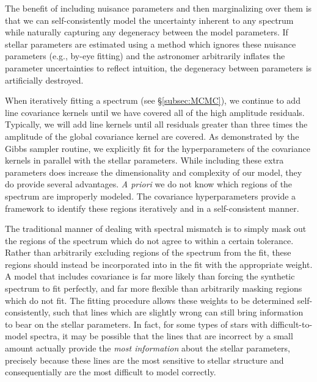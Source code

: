 \documentclass[iop,floatfix]{emulateapj}
\begin{document}
The benefit of including nuisance parameters and then marginalizing over them is that we can self-consistently model the uncertainty inherent to any spectrum while naturally capturing any degeneracy between the model parameters. If stellar parameters are estimated using a method which ignores these nuisance parameters (e.g., by-eye fitting) and the astronomer arbitrarily inflates the parameter uncertainties to reflect intuition, the degeneracy between parameters is artificially destroyed. 

When iteratively fitting a spectrum (see \S\ref{subsec:MCMC}), we continue to add line covariance kernels until we have covered all of the high amplitude residuals. Typically, we will add line kernels until all residuals greater than three times the amplitude of the global covariance kernel are covered.  As demonstrated by the Gibbs sampler routine, we explicitly fit for the
hyperparameters of the covariance kernels in parallel with the
stellar parameters. While including these extra parameters does increase the
dimensionality and complexity of our model, they do provide several advantages.
\emph{A priori} we do not know which regions of the spectrum are improperly
modeled. The covariance hyperparameters provide a framework to identify these
regions iteratively and in a self-consistent manner. 

The traditional manner of dealing with spectral mismatch is to simply mask out the regions of the spectrum which do not agree to within a certain tolerance.  Rather than arbitrarily excluding regions of the spectrum from the fit, these regions should instead be incorporated into in the fit with the appropriate weight. A model that includes covariance is far more likely than forcing the synthetic spectrum to fit perfectly, and far more flexible than arbitrarily masking regions which do not fit. The fitting procedure allows these weights to be determined self-consistently, such that lines which are slightly wrong can still bring information to bear on the stellar parameters. In fact, for some types of stars with difficult-to-model spectra, it may be possible that the lines that are incorrect by a small amount actually provide the \emph{most information} about the stellar parameters, precisely because these lines are the most sensitive to stellar structure and consequentially are the most difficult to model correctly.
\end{document}

